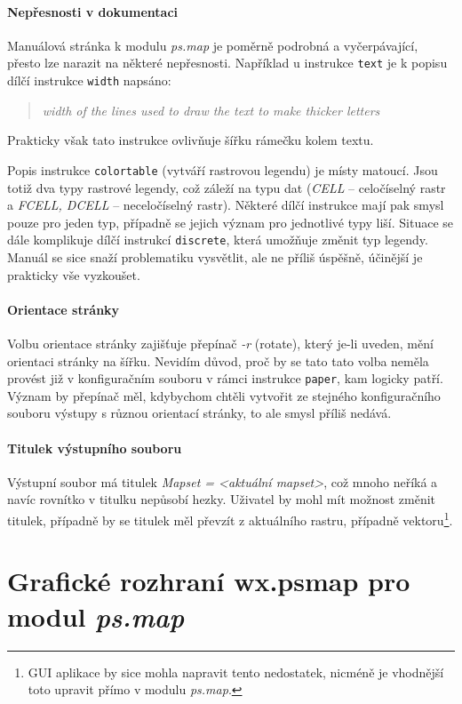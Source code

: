 \documentclass[a4paper,12pt,draft]{article}
\newcommand{\modul}[1]{\emph{#1}}
\newcommand{\instr}[1]{\lstinline[style=psmapInline]|#1|}
\begin{document}
\paragraph*{Nepřesnosti v dokumentaci}
\label{sec:psmap:manual}
Manuálová stránka \cite{manual} k modulu \modul{ps.map} je poměrně podrobná a vyčerpávající, přesto lze narazit na některé nepřesnosti. Například u instrukce \instr{text} je k popisu dílčí instrukce \instr{width} napsáno:
 \begin{quotation}\it
width of the lines used to draw the text to make thicker letters
\end{quotation}
Prakticky však tato instrukce ovlivňuje šířku rámečku kolem textu.

Popis instrukce \instr{colortable} (vytváří rastrovou legendu) je místy matoucí. Jsou totiž dva typy rastrové legendy, což záleží na typu dat (\emph{CELL} -- celočíselný rastr a \emph{FCELL, DCELL} -- neceločíselný rastr). Některé dílčí instrukce mají pak smysl pouze pro jeden typ, případně se jejich význam pro jednotlivé typy liší. Situace se dále komplikuje dílčí instrukcí \instr{discrete}, která umožňuje změnit typ legendy. Manuál se sice snaží problematiku vysvětlit, ale ne příliš úspěšně, účinější je prakticky vše vyzkoušet.

\paragraph*{Orientace stránky}
Volbu orientace stránky zajišťuje přepínač \emph{-r} (rotate), který je-li uveden, mění orientaci stránky na šířku. Nevidím důvod, proč by se tato tato volba neměla provést již v konfiguračním souboru v rámci instrukce \instr{paper}, kam logicky patří. Význam by přepínač měl, kdybychom chtěli vytvořit ze stejného konfiguračního souboru výstupy s různou orientací stránky, to ale smysl příliš nedává.

\paragraph*{Titulek výstupního souboru}
Výstupní soubor má titulek \emph{Mapset = \textless aktuální mapset\textgreater}, což mnoho neříká a navíc rovnítko v titulku nepůsobí hezky. Uživatel by mohl mít možnost změnit titulek, případně by se titulek měl převzít z aktuálního rastru, případně vektoru\footnote{GUI aplikace by sice mohla napravit tento nedostatek, nicméně je vhodnější toto upravit přímo v modulu \modul{ps.map}.}.

\section{Grafické rozhraní  wx.psmap pro modul \modul{ps.map}}
\label{sec:gui}
\end{document}
